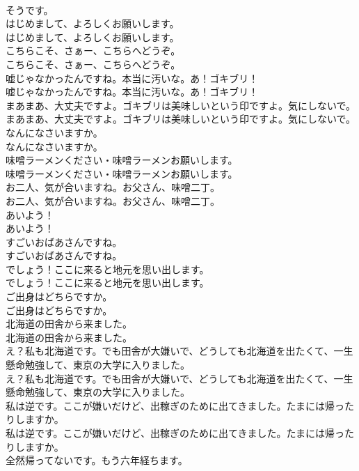 \documentclass[8pt]{extreport}
\begin{document}
\begin{CJK}{UTF8}{min}
\\	そうです。 
\\	はじめまして、よろしくお願いします。	
\\	はじめまして、よろしくお願いします。 
\\	こちらこそ、さぁー、こちらへどうぞ。	
\\	こちらこそ、さぁー、こちらへどうぞ。 
\\	嘘じゃなかったんですね。本当に汚いな。あ！ゴキブリ！	
\\	嘘じゃなかったんですね。本当に汚いな。あ！ゴキブリ！ 
\\	まあまあ、大丈夫ですよ。ゴキブリは美味しいという印ですよ。気にしないで。	
\\	まあまあ、大丈夫ですよ。ゴキブリは美味しいという印ですよ。気にしないで。 
\\	なんになさいますか。	
\\	なんになさいますか。 
\\	味噌ラーメンください・味噌ラーメンお願いします。	
\\	味噌ラーメンください・味噌ラーメンお願いします。 
\\	お二人、気が合いますね。お父さん、味噌二丁。	
\\	お二人、気が合いますね。お父さん、味噌二丁。 
\\	あいよう！	
\\	あいよう！ 
\\	すごいおばあさんですね。	
\\	すごいおばあさんですね。 
\\	でしょう！ここに来ると地元を思い出します。	
\\	でしょう！ここに来ると地元を思い出します。 
\\	ご出身はどちらですか。	
\\	ご出身はどちらですか。 
\\	北海道の田舎から来ました。	
\\	北海道の田舎から来ました。 
\\	え？私も北海道です。でも田舎が大嫌いで、どうしても北海道を出たくて、一生懸命勉強して、東京の大学に入りました。	
\\	え？私も北海道です。でも田舎が大嫌いで、どうしても北海道を出たくて、一生懸命勉強して、東京の大学に入りました。 
\\	私は逆です。ここが嫌いだけど、出稼ぎのために出てきました。たまには帰ったりしますか。	
\\	私は逆です。ここが嫌いだけど、出稼ぎのために出てきました。たまには帰ったりしますか。 
\\	全然帰ってないです。もう六年経ちます。	

\end{CJK}
\end{document}
